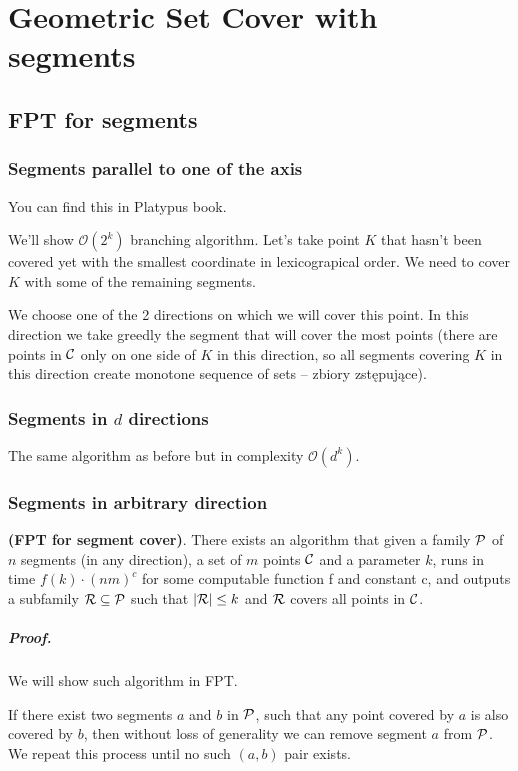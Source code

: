 \chapter{Geometric Set Cover with segments}

\section{FPT for segments}
\subsection{Segments parallel to one of the axis}
You can find this in Platypus book.

We'll show $\mathcal{O}(2^k)$ branching algorithm.
Let's take point $K$ that hasn't been covered yet with
the smallest coordinate in lexicograpical order.
We need to cover $K$ with some of the remaining segments.

We choose one of the 2 directions on which we will cover this point.
In this direction we take greedly the segment that will cover
the most points (there are points in $\mathcal{C}$ only on
one side of $K$ in this direction, so all
segments covering $K$ in this direction create monotone sequence
of sets -- zbiory zstępujące).

\subsection{Segments in $d$ directions}
The same algorithm as before but in complexity $\mathcal{O}(d^k)$.

\subsection{Segments in arbitrary direction}
\begin{tw}{
	\textbf{(FPT for segment cover)}.
	There exists an algorithm that given a family $\mathcal{P}$ of
	$n$ segments (in any direction),
	a set of $m$ points $\mathcal{C}$
	and a parameter $k$,
	runs in time $f(k) \cdot (nm)^c$ for some computable function f and constant c,
	and outputs a subfamily $\mathcal{R} \subseteq \mathcal{P}$
	such that $|\mathcal{R}| \le k$ and $\mathcal{R}$ covers all points in $\mathcal{C}$.
}\end{tw}
\paragraph{Proof.}
We will show such algorithm in FPT.

If there exist two segments $a$ and $b$ in $\mathcal{P}$,
such that any point covered by $a$ is also covered by $b$,
then without loss of generality we can remove segment $a$ from $\mathcal{P}$.
We repeat this process until no such $(a, b)$ pair exists.


